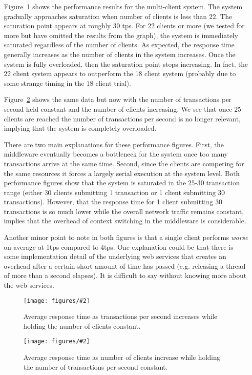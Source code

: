 \documentclass{article}
\newcommand{\addfigure}[4]{

\begin{figure}[h]
	\centering
	\texttt{[image: figures/\#2]}
	\caption{#3}
	\label{#4}
\end{figure}

}
\begin{document}
Figure~\ref{f:perf-txn} shows the performance results for the multi-client system. The system gradually approaches saturation when number of clients is less than 22. The saturation point appears at roughly 30 tps. For 22 clients or more (we tested for more but have omitted the results from the graph), the system is immediately saturated regardless of the number of clients. As expected, the response time generally increases as the number of clients in the system increases. Once the system is fully overloaded, then the saturation point stops increasing. In fact, the 22 client system appears to outperform the 18 client system (probably due to some strange timing in the 18 client trial).

Figure~\ref{f:perf-client} shows the same data but now with the number of transactions per second held constant and the number of clients increasing. We see that once 25 clients are reached the number of transactions per second is no longer relevant, implying that the system is completely overloaded. 

There are two main explanations for these performance figures. First, the middleware eventually becomes a bottleneck for the system once too many transactions arrive at the same time. Second, since the clients are competing for the same resources it forces a largely serial execution at the system level. Both performance figures show that the system is saturated in the 25-30 transaction range (either 30 clients submitting 1 transaction or 1 client submitting 30 transactions). However, that the response time for 1 client submitting 30 transactions is so much lower while the overall network traffic remains constant, implies that the overhead of context switching in the middleware is considerable.


Another minor point to note in both figures is that a single client performs \textit{worse} on average at 1tps compared to 4tps. One explanation could be that there is some implementation detail of the underlying web services that creates an overhead after a certain short amount of time has passed (e.g. releasing a thread of more than a second elapses). It is difficult to say without knowing more about the web services.
\addfigure{0.5}{perf-txn.pdf}{Average response time as transactions per second increases while holding the number of clients constant.}{f:perf-txn}
	
\addfigure{0.5}{perf-client.pdf}{Average response time as number of clients increase while holding the number of transactions per second constant.}{f:perf-client}
\end{document}
